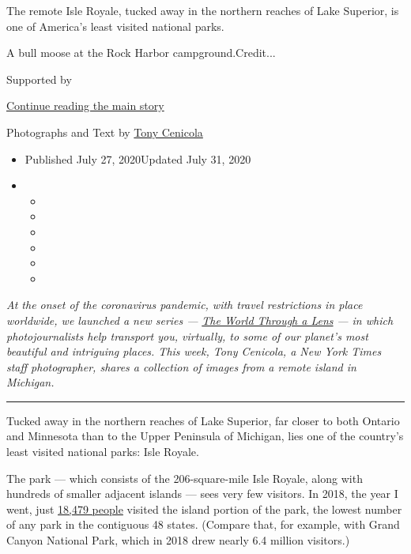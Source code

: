 The remote Isle Royale, tucked away in the northern reaches of Lake
Superior, is one of America's least visited national parks.

A bull moose at the Rock Harbor campground.Credit...

Supported by

\protect\hyperlink{after-sponsor}{Continue reading the main story}

Photographs and Text by
\href{https://www.nytimes3xbfgragh.onion/by/tony-cenicola}{Tony
Cenicola}

\begin{itemize}
\item
  Published July 27, 2020Updated July 31, 2020
\item
  \begin{itemize}
  \item
  \item
  \item
  \item
  \item
  \item
  \end{itemize}
\end{itemize}

\emph{At the onset of the coronavirus pandemic, with travel restrictions
in place worldwide, we launched a new series ---}
\href{https://www.nytimes3xbfgragh.onion/column/the-world-through-a-lens}{\emph{The
World Through a Lens}} \emph{--- in which photojournalists help
transport you, virtually, to some of our planet's most beautiful and
intriguing places. This week, Tony Cenicola, a New York Times staff
photographer, shares a collection of images from a remote island in
Michigan.}

\begin{center}\rule{0.5\linewidth}{\linethickness}\end{center}

Tucked away in the northern reaches of Lake Superior, far closer to both
Ontario and Minnesota than to the Upper Peninsula of Michigan, lies one
of the country's least visited national parks: Isle Royale.

The park --- which consists of the 206-square-mile Isle Royale, along
with hundreds of smaller adjacent islands --- sees very few visitors. In
2018, the year I went, just
\href{https://www.nps.gov/isro/learn/management/statistics.htm}{18,479
people} visited the island portion of the park, the lowest number of any
park in the contiguous 48 states. (Compare that, for example, with Grand
Canyon National Park, which in 2018 drew nearly 6.4 million visitors.)

